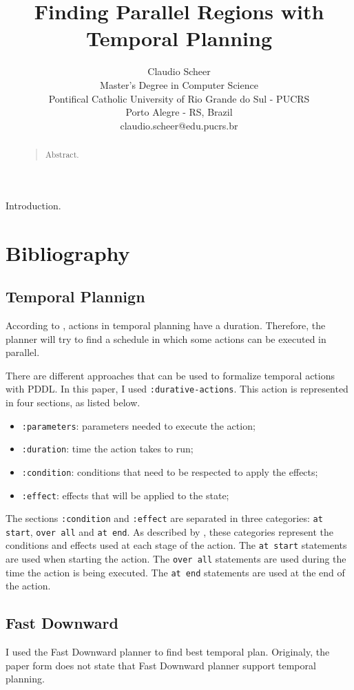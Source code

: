 \documentclass[letterpaper]{article}
\begin{document}
\title{Finding Parallel Regions with Temporal Planning}
\author{Claudio Scheer\\
    Master's Degree in Computer Science\\
    Pontifical Catholic University of Rio Grande do Sul - PUCRS\\
    Porto Alegre - RS, Brazil\\
    claudio.scheer@edu.pucrs.br\\
}
\maketitle

\begin{abstract}
    \begin{quote}
        Abstract.
    \end{quote}
\end{abstract}

\noindent Introduction.


\section{Bibliography}

\subsection{Temporal Plannign}

According to \cite{DBLP:series/synthesis/2019Haslum}, actions in temporal planning have a duration. Therefore, the planner will try to find a schedule in which some actions can be executed in parallel.

There are different approaches that can be used to formalize temporal actions with PDDL. In this paper, I used \texttt{:durative-actions}. This action is represented in four sections, as listed below.

\begin{itemize}
    \item \texttt{:parameters}: parameters needed to execute the action;
    \item \texttt{:duration}: time the action takes to run;
    \item \texttt{:condition}: conditions that need to be respected to apply the effects;
    \item \texttt{:effect}: effects that will be applied to the state;
\end{itemize}

The sections \texttt{:condition} and \texttt{:effect} are separated in three categories: \texttt{at start}, \texttt{over all} and \texttt{at end}. As described by \cite{DBLP:series/synthesis/2019Haslum}, these categories represent the conditions and effects used at each stage of the action. The \texttt{at start} statements are used when starting the action. The \texttt{over all} statements are used during the time the action is being executed. The \texttt{at end} statements are used at the end of the action.


\subsection{Fast Downward}

I used the Fast Downward planner to find best temporal plan. Originaly, the paper form \cite{Helmert_2006} does not state that Fast Downward planner support temporal planning.




\end{document}
